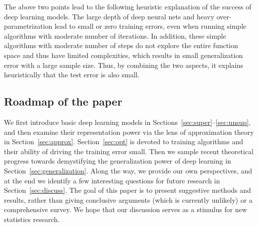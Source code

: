 The above two points lead to the following heuristic explanation of the success of deep learning models. The large depth of deep neural nets and heavy over-parametrization lead to small or zero training errors, even when running simple algorithms with moderate number of iterations. In addition, these simple algorithms with moderate number of steps do not explore the entire function space and thus have limited complexities, which results in small generalization error with a large sample size. Thus, by combining the two aspects, it explains heuristically that the test error is also small.

\subsection{Roadmap of the paper}

We first introduce basic deep learning models in Sections~\ref{sec:super}--\ref{sec:unsup}, and then examine their representation power via the lens of approximation theory in Section~\ref{sec:approx}. Section~\ref{sec:opt} is devoted to training algorithms and their ability of driving the training error small. Then we sample recent theoretical progress towards demystifying the generalization power of deep learning in Section~\ref{sec:generalization}. Along the way, we provide our own perspectives, and at the end we identify a few interesting questions for future research in Section~\ref{sec:discuss}. The goal of this paper is to present suggestive methods and results, rather than giving conclusive arguments (which is currently unlikely) or a comprehensive survey. We hope that our discussion serves as a stimulus for new statistics research.




